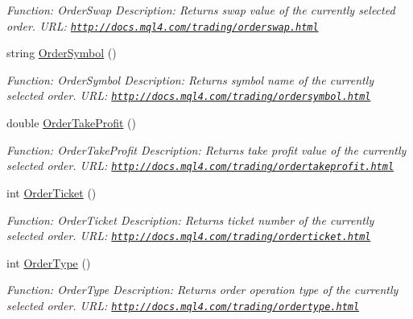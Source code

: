 \begin{DoxyCompactItemize}
\begin{DoxyCompactList}\small\item\em Function\+: Order\+Swap Description\+: Returns swap value of the currently selected order. U\+RL\+: \href{http://docs.mql4.com/trading/orderswap.html}{\tt http\+://docs.\+mql4.\+com/trading/orderswap.\+html} \end{DoxyCompactList}\item 
string \hyperlink{class_m_q_l4_c_sharp_1_1_base_1_1_m_q_l_base_a50a0624ba60bbec96d19796469222013}{Order\+Symbol} ()
\begin{DoxyCompactList}\small\item\em Function\+: Order\+Symbol Description\+: Returns symbol name of the currently selected order. U\+RL\+: \href{http://docs.mql4.com/trading/ordersymbol.html}{\tt http\+://docs.\+mql4.\+com/trading/ordersymbol.\+html} \end{DoxyCompactList}\item 
double \hyperlink{class_m_q_l4_c_sharp_1_1_base_1_1_m_q_l_base_a8d514107cf5c59b68339dcd90d56f663}{Order\+Take\+Profit} ()
\begin{DoxyCompactList}\small\item\em Function\+: Order\+Take\+Profit Description\+: Returns take profit value of the currently selected order. U\+RL\+: \href{http://docs.mql4.com/trading/ordertakeprofit.html}{\tt http\+://docs.\+mql4.\+com/trading/ordertakeprofit.\+html} \end{DoxyCompactList}\item 
int \hyperlink{class_m_q_l4_c_sharp_1_1_base_1_1_m_q_l_base_a49fa445f39949bf12f91e0558d07f665}{Order\+Ticket} ()
\begin{DoxyCompactList}\small\item\em Function\+: Order\+Ticket Description\+: Returns ticket number of the currently selected order. U\+RL\+: \href{http://docs.mql4.com/trading/orderticket.html}{\tt http\+://docs.\+mql4.\+com/trading/orderticket.\+html} \end{DoxyCompactList}\item 
int \hyperlink{class_m_q_l4_c_sharp_1_1_base_1_1_m_q_l_base_a8bb21de3fdfcfa1f2d0c4f660ae65c45}{Order\+Type} ()
\begin{DoxyCompactList}\small\item\em Function\+: Order\+Type Description\+: Returns order operation type of the currently selected order. U\+RL\+: \href{http://docs.mql4.com/trading/ordertype.html}{\tt http\+://docs.\+mql4.\+com/trading/ordertype.\+html} \end{DoxyCompactList}\item 

\end{DoxyCompactItemize}
